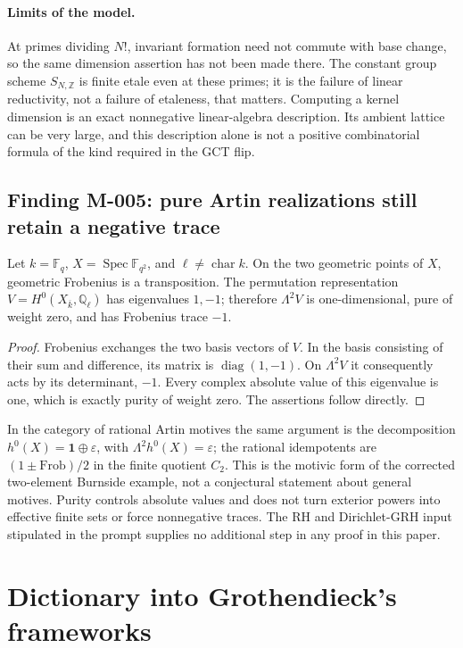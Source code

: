\paragraph{Limits of the model.}
At primes dividing \(N!\), invariant formation need not commute
with base change, so the same dimension assertion has not been
made there.  The constant group scheme \(S_{N,\mathbb Z}\) is finite
etale even at these primes; it is the failure of linear
reductivity, not a failure of etaleness, that matters.
Computing a kernel dimension is an exact nonnegative linear-algebra
description.  Its ambient lattice can be very large, and this
description alone is not a positive combinatorial formula of the
kind required in the GCT flip.

\subsection*{Finding M-005: pure Artin realizations still retain a negative trace}
Let \(k=\mathbb F_q\), \(X=\operatorname{Spec}\mathbb F_{q^2}\), and
\(\ell\ne\operatorname{char}k\).
On the two geometric points of \(X\), geometric Frobenius is a
transposition.  The permutation representation
\(V=H^0(X_{\overline k},\mathbb Q_\ell)\) has eigenvalues \(1,-1\);
therefore \(\Lambda^2V\) is one-dimensional, pure of weight zero,
and has Frobenius trace \(-1\).

\begin{proof}
Frobenius exchanges the two basis vectors of \(V\).
In the basis consisting of their sum and difference, its matrix
is \(\operatorname{diag}(1,-1)\).
On \(\Lambda^2V\) it consequently acts by its determinant, \(-1\).
Every complex absolute value of this eigenvalue is one, which is
exactly purity of weight zero.  The assertions follow directly.
\end{proof}

In the category of rational Artin motives the same argument is the
decomposition \(h^0(X)=\mathbf1\oplus\varepsilon\), with
\(\Lambda^2h^0(X)=\varepsilon\); the rational idempotents are
\((1\pm \mathrm{Frob})/2\) in the finite quotient \(C_2\).
This is the motivic form of the corrected two-element Burnside
example, not a conjectural statement about general motives.
Purity controls absolute values and does not turn exterior powers
into effective finite sets or force nonnegative traces.  The RH
and Dirichlet-GRH input stipulated in the prompt supplies no
additional step in any proof in this paper.

\section{Dictionary into Grothendieck's frameworks}

